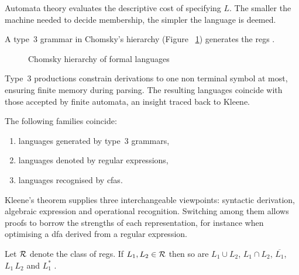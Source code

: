Automata theory evaluates the descriptive cost of specifying $L$.  
The smaller the machine needed to decide membership, the simpler the language is deemed.  

\begin{concept}\label{concept:regular-grammar}
A type~3 grammar in Chomsky's hierarchy (Figure ~\ref{fig:chomsky-hierarchy}) generates the \glspl{reg} \cite{chomsky1959certain}.  
\end{concept}

\begin{figure}[h]
  \centering
  \caption{Chomsky hierarchy of formal languages}
  \label{fig:chomsky-hierarchy}
\end{figure}


Type~3 productions constrain derivations to one non terminal symbol at most,  
ensuring finite memory during parsing.  
The resulting languages coincide with those accepted by finite automata, an insight traced back to Kleene.  

\begin{theorem}\label{thm:kleene}
The following families coincide:
\begin{enumerate}
  \item languages generated by type~3 grammars,
  \item languages denoted by regular expressions,
  \item languages recognised by \glspl{cfa}.
\end{enumerate}
\cite{kleene1951representationof}
\end{theorem}

Kleene's theorem supplies three interchangeable viewpoints:  
syntactic derivation, algebraic expression and operational recognition.  
Switching among them allows proofs to borrow the strengths of each representation,  
for instance when optimising a \gls{dfa} derived from a regular expression.  

\begin{proposition}\label{prop:closure}
Let ${\cal R}$ denote the class of \glspl{reg}.  
If $L_{1},L_{2}\in{\cal R}$ then so are
$L_{1}\cup L_{2}$, $L_{1}\cap L_{2}$, $\overline{L_{1}}$,
$L_{1}\,L_{2}$ and $L_{1}^{\ast}$ \cite{hopcroft2001introduction}.  
\end{proposition}


